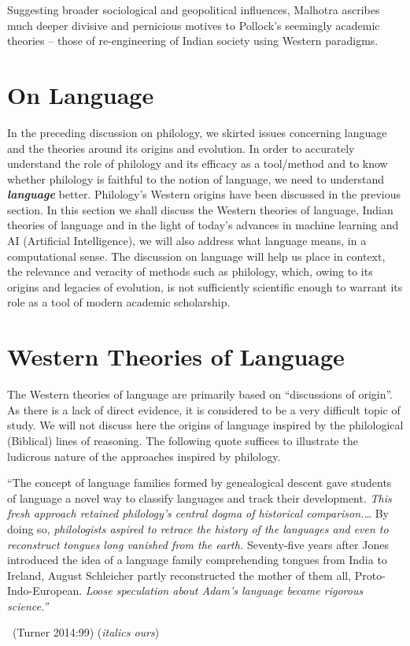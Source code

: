 Suggesting broader sociological and geopolitical influences, Malhotra ascribes much deeper divisive and pernicious motives to Pollock’s seemingly academic theories – those of re-engineering of Indian society using Western paradigms.


\section*{On Language}

In the preceding discussion on philology, we skirted issues concerning language and the theories around its origins and evolution. In order to accurately understand the role of philology and its efficacy as a tool/method and to know whether philology is faithful to the notion of language, we need to understand \textbf{\textit{language}} better. Philology’s Western origins have been discussed in the previous section. In this section we shall discuss the Western theories of language, Indian theories of language and in the light of today’s advances in machine learning and AI (Artificial Intelligence), we will also address what language means, in a computational sense. The discussion on language will help us place in context, the relevance and veracity of methods such as philology, which, owing to its origins and legacies of evolution, is not sufficiently scientific enough to warrant its role as a tool of modern academic scholarship.


\section*{Western Theories of Language}

The Western theories of language are primarily based on “discussions of origin”. As there is a lack of direct evidence, it is considered to be a very difficult topic of study. We will not discuss here the origins of language inspired by the philological (Biblical) lines of reasoning. The following quote suffices to illustrate the ludicrous nature of the approaches inspired by philology.

\begin{myquote}
“The concept of language families formed by genealogical descent gave students of language a novel way to classify languages and track their development. \textit{This fresh approach retained philology’s central dogma of historical comparison.…} By doing so, \textit{philologists aspired to retrace the history of the languages and even to reconstruct tongues long vanished from the earth.} Seventy-five years after Jones introduced the idea of a language family comprehending tongues from India to Ireland, August Schleicher partly reconstructed the mother of them all, Proto-Indo-European. \textit{Loose speculation about Adam’s language became rigorous science.”}

~\hfill (Turner 2014:99) (\textit{italics ours})
\end{myquote}


